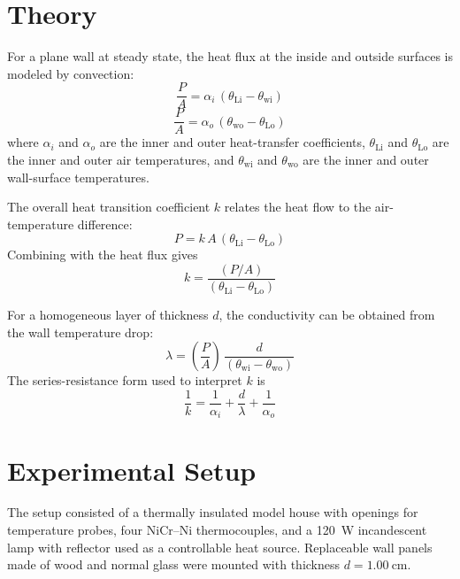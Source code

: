 \documentclass[journal]{IEEEtran}
\begin{document}
\section{Theory}

For a plane wall at steady state, the heat flux at the inside and outside surfaces is modeled by convection:
\begin{equation}
\frac{P}{A} = \alpha_i\,\left(\theta_{\mathrm{Li}}-\theta_{\mathrm{wi}}\right)
\label{eq:q_in}
\end{equation}
\begin{equation}
\frac{P}{A} = \alpha_o\,\left(\theta_{\mathrm{wo}}-\theta_{\mathrm{Lo}}\right)
\label{eq:q_out}
\end{equation}
where $\alpha_i$ and $\alpha_o$ are the inner and outer heat-transfer coefficients, $\theta_{\mathrm{Li}}$ and $\theta_{\mathrm{Lo}}$ are the inner and outer air temperatures, and $\theta_{\mathrm{wi}}$ and $\theta_{\mathrm{wo}}$ are the inner and outer wall-surface temperatures.

The overall heat transition coefficient $k$ relates the heat flow to the air-temperature difference:
\begin{equation}
P = k\,A\,\left(\theta_{\mathrm{Li}}-\theta_{\mathrm{Lo}}\right)
\label{eq:P_overall}
\end{equation}
Combining with the heat flux gives
\begin{equation}
k = \frac{(P/A)}{\left(\theta_{\mathrm{Li}}-\theta_{\mathrm{Lo}}\right)}
\label{eq:k_def}
\end{equation}

For a homogeneous layer of thickness $d$, the conductivity can be obtained from the wall temperature drop:
\begin{equation}
\lambda = \left(\frac{P}{A}\right)\,\frac{d}{\left(\theta_{\mathrm{wi}}-\theta_{\mathrm{wo}}\right)}
\label{eq:lambda_def}
\end{equation}
The series-resistance form used to interpret $k$ is
\begin{equation}
\frac{1}{k} = \frac{1}{\alpha_i} + \frac{d}{\lambda} + \frac{1}{\alpha_o}
\label{eq:series_resistance}
\end{equation}

\section{Experimental Setup}
The setup consisted of a thermally insulated model house with openings for temperature probes, four NiCr--Ni thermocouples, and a \SI{120}{\watt} incandescent lamp with reflector used as a controllable heat source. Replaceable wall panels made of wood and normal glass were mounted with thickness $d=\SI{1.00}{\centi\meter}$.
\end{document}
